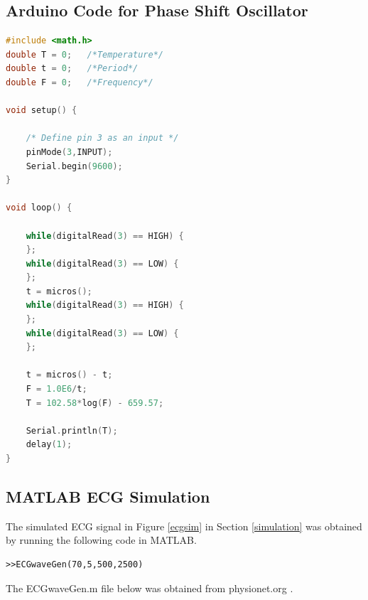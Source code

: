 \subsection{Arduino Code for Phase Shift Oscillator}
\label{arduinopso}

\begin{lstlisting}[language=c]
#include <math.h>
double T = 0;  	/*Temperature*/
double t = 0;	/*Period*/
double F = 0;	/*Frequency*/

void setup() {

	/* Define pin 3 as an input */
	pinMode(3,INPUT);
	Serial.begin(9600); 
}

void loop() {

	while(digitalRead(3) == HIGH) {
	}; 
	while(digitalRead(3) == LOW) {
	};
	t = micros();
	while(digitalRead(3) == HIGH) {
	};
	while(digitalRead(3) == LOW) {
	}; 

	t = micros() - t;
	F = 1.0E6/t;
	T = 102.58*log(F) - 659.57; 

	Serial.println(T); 
	delay(1); 
}

\end{lstlisting}

\subsection{MATLAB ECG Simulation}
\label{ecgsimulationcode}

The simulated ECG signal in Figure \ref{ecgsim} in Section \ref{simulation} was obtained by running the following code in MATLAB.

\begin{lstlisting}
>>ECGwaveGen(70,5,500,2500)
\end{lstlisting}

The ECGwaveGen.m file below was obtained from physionet.org \cite{ecgsimulation}.

